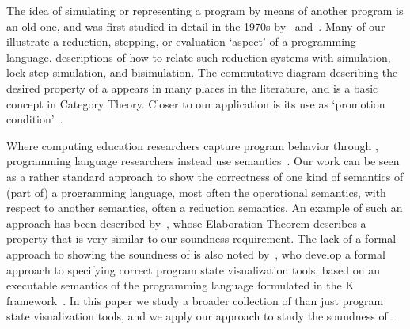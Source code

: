 The idea of simulating or representing a program by means of another program is an old one, 
and was first studied in detail in the 1970s by~\citet{milnerAlgebraicDefinitionSimulation1971} and~\citet{hoareProofCorrectnessData1972}. 
Many of our \nms{} illustrate a reduction, stepping, or evaluation `aspect' of a programming language. 
\citet{wadlerProgrammingLanguageFoundations2020} descriptions of how to relate such reduction systems with simulation, lock-step simulation, and bisimulation.
The commutative diagram describing the desired property of a \nm{} appears in many places in the literature, and is a basic concept in Category Theory. Closer to our application is its use as `promotion condition'~\cite{birdPromotionAccumulationStrategies1984,wangRefactoringPatternMatching2013}.

Where computing education researchers capture program behavior through \nms{}, programming language researchers instead use semantics~\cite{krishnamurthiProgrammingParadigms2019}. Our work can be seen as a rather standard approach to show the correctness of one kind of semantics of (part of) a programming language, most often the operational semantics, with respect to another semantics, often a reduction semantics. An example of such an approach has been described by~\citet{clementsModelingAlgebraicStepper2001}, whose Elaboration Theorem describes a property that is very similar to our soundness requirement.
%
The lack of a formal approach to showing the soundness of \nms{} is also noted by~\citet{pollockTheiaAutomaticallyGenerating2019}, who develop a formal approach to specifying correct program state visualization tools, based on an executable semantics of the programming language formulated in the K framework~\citep{rosuOverviewSemanticFramework2010}.
In this paper we study a broader collection of \nms{} than just program state visualization tools, and we apply our approach to study the soundness of \nms{}.



